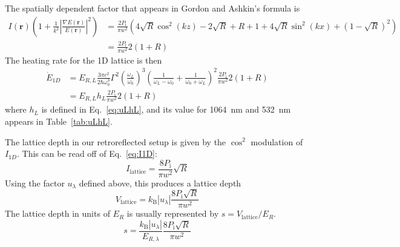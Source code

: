 \documentclass[11pt,letter]{article}
\newcommand{\bv}[1]{\ensuremath{\bm{#1}}}
\begin{document}
The spatially dependent factor that appears in Gordon and Ashkin's formula is
\begin{equation}
\begin{split}
   I(\bv{r}) 
  \left( 1 + \frac{1}{k^{2}}
    \left| 
   \frac{ \nabla E(\bv{r}) }
        {  E(\bv{r})} 
    \right|^{2} \right) & =  
   \frac{2 P_{\text{i}}}{\pi w^{2}} \left(
   4\sqrt{R}\cos^{2}(kz) - 2\sqrt{R} +R+1 
  + 
      4\sqrt{R} \sin^{2}(kx) +(1-\sqrt{R})^{2} 
  \right)  \\ 
   & =  
   \frac{2 P_{\text{i}}}{\pi w^{2}} 2 ( 1+R)
\end{split} 
\end{equation}
The heating rate for the 1D lattice is then
\begin{equation}
\begin{split}
  \dot{E}_{1D} & =  
   E_{R,L} 
   \frac{3\pi c^{2}}{2\hbar \omega_{0}^{3} } \Gamma^{2}
    \left( \frac{ \omega_{L} }{ \omega_{0}} \right)^{3} 
    \left(  \frac{1}{\omega_{L}-\omega_{0}} 
           + \frac{1}{\omega_{0} + \omega_{L}}  \right)^{2} 
   \frac{2 P_{\text{i}}}{\pi w^{2}} 2 ( 1+R) \\
    & = E_{R,L} h_{L}  
   \frac{2 P_{\text{i}}}{\pi w^{2}} 2 ( 1+R)  	 
\end{split}
\end{equation}
where $h_{L}$ is defined in Eq.~\ref{eq:uLhL}, and its value for 1064~nm and
532~nm appears in Table~\ref{tab:uLhL}. 


The lattice depth in our retroreflected setup is given by the $\cos^{2}$
modulation of $I_{1D}$.  This can be read off of Eq.~\ref{eq:I1D}:
\begin{equation}
  I_{\text{lattice}} = \frac{ 8 P_{\text{i}}}{\pi w^{2}} \sqrt{R} 
\end{equation}
Using the factor $u_{\lambda}$ defined above, this produces a  lattice depth
\begin{equation} 
  V_{\text{lattice}} =  k_{\text{B}} |u_{\lambda}|  
   \frac{ 8 P_{\text{i}}\sqrt{R}}{\pi w^{2}}
\end{equation}
The lattice depth in units of $E_{R}$ is usually represented by $s =
V_{\text{lattice}}/E_{R}$.    
\begin{equation}
  s =  
 \frac{k_{\text{B}}|u_{\lambda}|}{E_{R,\lambda}} 
  \frac{ 8 P_{\text{i}} \sqrt{R} }{\pi w^{2}}
 \label{eq:slatt} 
\end{equation}
\end{document}
